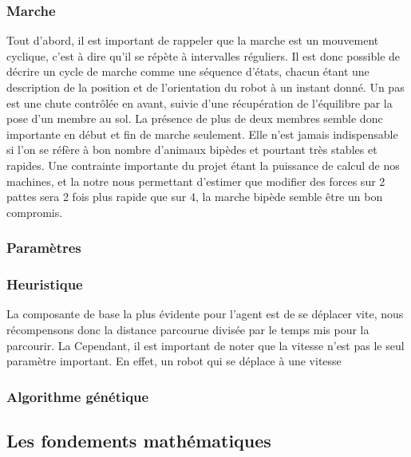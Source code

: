 \documentclass[journal, a4paper]{IEEEtran}
\begin{document}

	\subsubsection{Marche}
	Tout d'abord, il est important de rappeler que la marche est un
	mouvement cyclique, c'est à dire qu'il se répète à intervalles
	réguliers. Il est donc possible de décrire un cycle de marche
	comme une séquence d'états, chacun étant une description de la
	position et de l'orientation du robot à un instant donné.
	Un pas est une chute contrôlée en avant, suivie d'une récupération
	de l'équilibre par la pose d'un membre au sol.
	La présence de plus de deux membres semble donc importante en début
	et fin de marche seulement. Elle n'est jamais indispensable si l'on
	se réfère à bon nombre d'animaux bipèdes et pourtant très stables et
	rapides.
	Une contrainte importante du projet étant la puissance de calcul
	de nos machines, et la notre nous permettant d'estimer que
	modifier des forces sur 2 pattes sera 2 fois plus rapide que sur 4,
	la marche bipède semble être un bon compromis.

	\subsubsection{Paramètres}

	\subsubsection{Heuristique}

	La composante de base la plus évidente pour l'agent est de se
	déplacer vite, nous récompensons donc la distance parcourue
	divisée par le temps mis pour la parcourir. La
	Cependant, il est
	important de noter que la vitesse n'est pas le seul paramètre
	important. En effet, un robot qui se déplace à une vitesse


	\subsubsection{Algorithme génétique}
	\subsection{Les fondements mathématiques}
\end{document}
